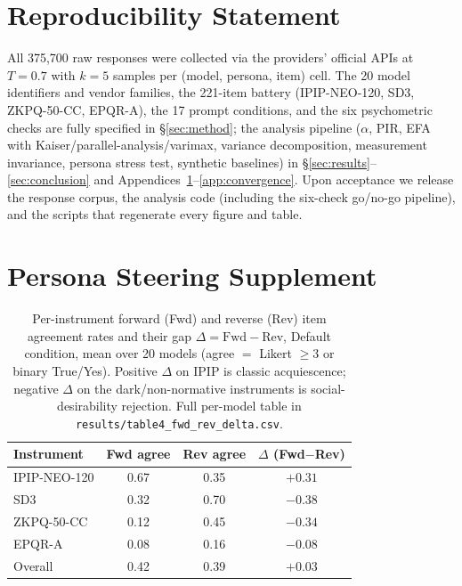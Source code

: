 \documentclass{article}
\begin{document}
\section*{Reproducibility Statement}
All 375{,}700 raw responses were collected via the providers' official APIs at $T{=}0.7$ with $k{=}5$ samples per (model, persona, item) cell. The 20 model identifiers and vendor families, the 221-item battery (IPIP-NEO-120, SD3, ZKPQ-50-CC, EPQR-A), the 17 prompt conditions, and the six psychometric checks are fully specified in \S\ref{sec:method}; the analysis pipeline ($\alpha$, PIR, EFA with Kaiser/parallel-analysis/varimax, variance decomposition, measurement invariance, persona stress test, synthetic baselines) in \S\ref{sec:results}--\ref{sec:conclusion} and Appendices~\ref{app:persona}--\ref{app:convergence}. Upon acceptance we release the response corpus, the analysis code (including the six-check go/no-go pipeline), and the scripts that regenerate every figure and table.





\clearpage
\appendix


\section{Persona Steering Supplement}
\label{app:persona}

\begin{table}[h]
\centering
\small
\begin{tabular}{lccc}
\toprule
Instrument & Fwd agree & Rev agree & $\Delta$ (Fwd$-$Rev) \\
\midrule
IPIP-NEO-120 & 0.67 & 0.35 & $+0.31$ \\
SD3          & 0.32 & 0.70 & $-0.38$ \\
ZKPQ-50-CC   & 0.12 & 0.45 & $-0.34$ \\
EPQR-A       & 0.08 & 0.16 & $-0.08$ \\
\midrule
Overall      & 0.42 & 0.39 & $+0.03$ \\
\bottomrule
\end{tabular}
\caption{Per-instrument forward (Fwd) and reverse (Rev) item agreement rates and their gap $\Delta=\text{Fwd}-\text{Rev}$, Default condition, mean over 20 models (agree $=$ Likert $\geq3$ or binary True/Yes). Positive $\Delta$ on IPIP is classic acquiescence; negative $\Delta$ on the dark/non-normative instruments is social-desirability rejection. Full per-model table in \texttt{results/table4\_fwd\_rev\_delta.csv}.}
\label{tab:fwd_rev_delta}
\end{table}
\end{document}
